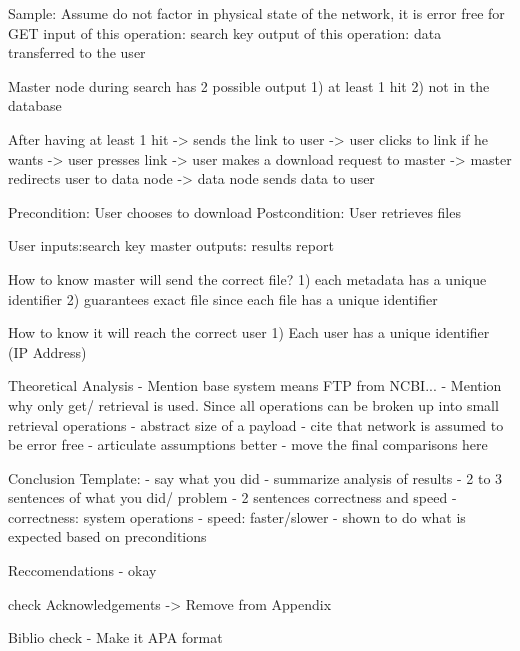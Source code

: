 Sample:
Assume do not factor in physical state of the network, it is error free
for GET
input of this operation: search key
output of this operation: data transferred to the user

Master node during search has 2 possible output
1) at least 1 hit
2) not in the database

After having at least 1 hit
-> sends the link to user
-> user clicks to link if he wants
-> user presses link
-> user makes a download request to master
-> master redirects user to data node
-> data node sends data to user

Precondition: User chooses to download
Postcondition: User retrieves files

User inputs:search key
master outputs: results report

How to know master will send the correct file?
1) each metadata has a unique identifier
2) guarantees exact file since each file has a unique identifier

How to know it will reach the correct user
1) Each user has a unique identifier (IP Address)

Theoretical Analysis
- Mention base system means FTP from NCBI...
- Mention why only get/ retrieval is used. Since all operations can be broken up into small retrieval operations
- abstract size of a payload
- cite that network is assumed to be error free
- articulate assumptions better
- move the final comparisons here

Conclusion Template:
- say what you did
- summarize analysis of results
- 2 to 3 sentences of what you did/ problem
- 2 sentences correctness and speed
- correctness: system operations
- speed: faster/slower
- shown to do what is expected based on preconditions

Reccomendations
- okay

check Acknowledgements -> Remove from Appendix

Biblio
check - Make it APA format
